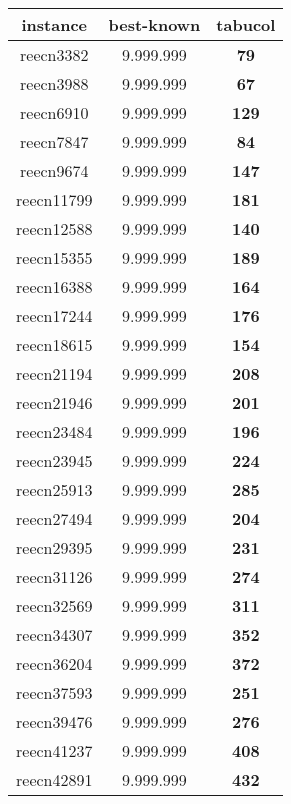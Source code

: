 \begin{tabular}{cc||c}
instance & best-known & tabucol \\ 
 \hline 
reecn3382        & 9.999.999        & {\bf 79}        \\ 
reecn3988        & 9.999.999        & {\bf 67}        \\ 
reecn6910        & 9.999.999        & {\bf 129}       \\ 
reecn7847        & 9.999.999        & {\bf 84}        \\ 
reecn9674        & 9.999.999        & {\bf 147}       \\ 
reecn11799       & 9.999.999        & {\bf 181}       \\ 
reecn12588       & 9.999.999        & {\bf 140}       \\ 
reecn15355       & 9.999.999        & {\bf 189}       \\ 
reecn16388       & 9.999.999        & {\bf 164}       \\ 
reecn17244       & 9.999.999        & {\bf 176}       \\ 
reecn18615       & 9.999.999        & {\bf 154}       \\ 
reecn21194       & 9.999.999        & {\bf 208}       \\ 
reecn21946       & 9.999.999        & {\bf 201}       \\ 
reecn23484       & 9.999.999        & {\bf 196}       \\ 
reecn23945       & 9.999.999        & {\bf 224}       \\ 
reecn25913       & 9.999.999        & {\bf 285}       \\ 
reecn27494       & 9.999.999        & {\bf 204}       \\ 
reecn29395       & 9.999.999        & {\bf 231}       \\ 
reecn31126       & 9.999.999        & {\bf 274}       \\ 
reecn32569       & 9.999.999        & {\bf 311}       \\ 
reecn34307       & 9.999.999        & {\bf 352}       \\ 
reecn36204       & 9.999.999        & {\bf 372}       \\ 
reecn37593       & 9.999.999        & {\bf 251}       \\ 
reecn39476       & 9.999.999        & {\bf 276}       \\ 
reecn41237       & 9.999.999        & {\bf 408}       \\ 
reecn42891       & 9.999.999        & {\bf 432}       \\ 

\end{tabular}

